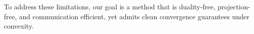 \documentclass{article} %
\begin{document}

To address these limitations, our goal is a method that is {duality-free}, {projection-free}, and {communication efficient}, yet admits clean convergence guarantees under convexity.
\end{document}
